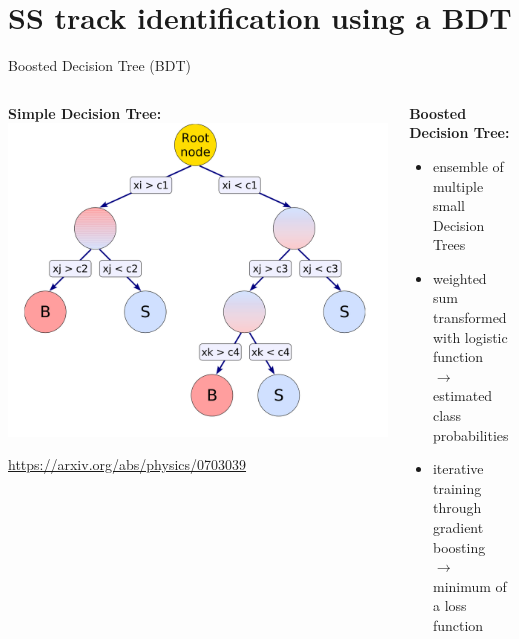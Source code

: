 \documentclass[aspectratio=1610, 10pt]{beamer}
\begin{document}
\section*{SS track identification using a BDT}

\begin{frame}{Boosted Decision Tree (BDT)}
  \begin{columns}
    \begin{column}{0.5\textwidth}
      \centering
      \textbf{Simple Decision Tree:}
      \includegraphics[width=\textwidth]{images/decision_tree.png}

      \tiny \url{https://arxiv.org/abs/physics/0703039}
    \end{column}
    \pause
    \begin{column}{0.5\textwidth}
      \textbf{Boosted Decision Tree:}
      \begin{itemize}
        \item ensemble of multiple small Decision Trees
        \item weighted sum transformed with logistic function \\$\rightarrow$ estimated class probabilities
        \item iterative training through gradient boosting \\$\rightarrow$ minimum of a loss function
      \end{itemize}
    \end{column}
  \end{columns}
\end{frame}
\end{document}
